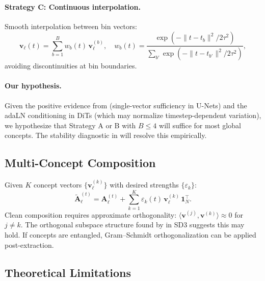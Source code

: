 \documentclass[11pt]{article}
\newcommand{\bv}{\mathbf{v}}
\newcommand{\bA}{\mathbf{A}}
\begin{document}
\paragraph{Strategy C: Continuous interpolation.}
Smooth interpolation between bin vectors:
\begin{equation}
    \bv_\ell(t) = \sum_{b=1}^{B} w_b(t)\, \bv_\ell^{(b)}, \quad w_b(t) = \frac{\exp(-\|t - t_b\|^2 / 2\tau^2)}{\sum_{b'} \exp(-\|t - t_{b'}\|^2 / 2\tau^2)},
\end{equation}
avoiding discontinuities at bin boundaries.

\paragraph{Our hypothesis.}
Given the positive evidence from \citet{li2024selfdiscovering} (single-vector sufficiency in U-Nets) and the adaLN conditioning in DiTs (which may normalize timestep-dependent variation), we hypothesize that Strategy A or B with $B \leq 4$ will suffice for most global concepts.
The stability diagnostic in  will resolve this empirically.

\subsection{Multi-Concept Composition}

Given $K$ concept vectors $\{\bv_\ell^{(k)}\}$ with desired strengths $\{\varepsilon_k\}$:
\begin{equation}
    \tilde{\bA}_\ell^{(t)} = \bA_\ell^{(t)} + \sum_{k=1}^{K} \varepsilon_k(t)\, \bv_\ell^{(k)}\, \mathbf{1}_N^\top.
    \label{eq:compose}
\end{equation}
Clean composition requires approximate orthogonality: $\langle \bv^{(j)}, \bv^{(k)} \rangle \approx 0$ for $j \neq k$.
The orthogonal subspace structure found by \citet{park2024dit} in SD3 suggests this may hold.
If concepts are entangled, Gram--Schmidt orthogonalization can be applied post-extraction.

\subsection{Theoretical Limitations}
\end{document}
